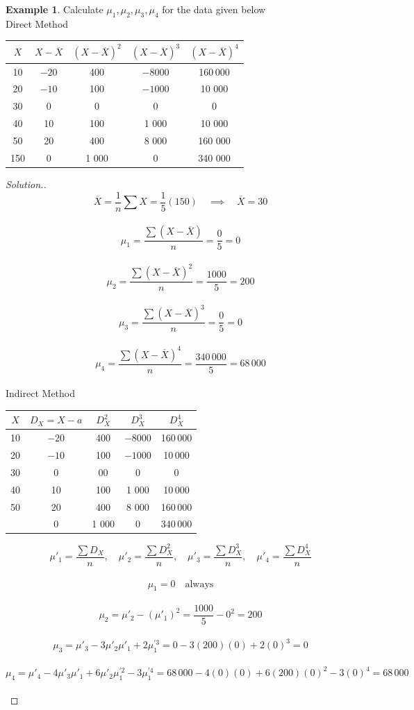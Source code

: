 \documentclass[11pt,a4paper]{article}
\theoremstyle{definition}
\newtheorem{example}[thm]{Example}
\newenvironment{solution}
  {\renewcommand{\qedsymbol}{}\begin{proof}[\textit{Solution}.]}
  {\end{proof}}
\begin{document}
\begin{example}
Calculate $\mu_1, \mu_2, \mu_3, \mu_4$ for the data given below\\
Direct Method\\

\begin{table}[H]
\centering
\begin{tabular}{|c|c|c|c|c|}
\hline $X$&$X-\overline{X}$&$(X-\overline{X})^2$&$(X-\overline{X})^3$&$(X-\overline{X})^4$\\
\hline 10&$-20$&400&$-8 000$&160\,000\\
20&$-10$&100&$-1 000$&10 000\\
30&0&0&0&0\\
40&10&100&1 000&10 000\\
50&20&400&8 000&160 000\\
\hline 150&0&1 000&0& 340 000\\
\hline
\end{tabular}
\end{table}
\end{example}

\begin{solution}
\[\overline{X}=\frac{1}{n}\sum X=\frac{1}{5}(150)\quad \implies\quad \overline{X}=30\]\\
\[\mu_1=\frac{\sum (X-\overline{X})}{n}=\frac{0}{5}=0\]\\
\[\mu_2=\frac{\sum (X-\overline{X})^2}{n}=\frac{1000}{5}=200\]\\
\[\mu_3=\frac{\sum (X-\overline{X})^3}{n}=\frac{0}{5}=0\]\\
\[\mu_4=\frac{\sum (X-\overline{X})^4}{n}=\frac{340\,000}{5}=68\,000\]\\


Indirect Method\\
\begin{table}[H]
\centering
\begin{tabular}{|c|c|c|c|c|}
\hline $X$&$D_X=X-a$&$D_X^2$&$D^3_X$&$D_X^4$\\
\hline 10&$-20$&400&$-8 000$& 160\,000\\
20&$-10$&100&$-1 000$&10\,000\\
30&0&00&0&0\\
40&10&100&1 000&10\,000\\
50&20&400&8 000&160\,000\\
\hline &0&1 000&0&340\,000\\
\hline
\end{tabular}
\end{table}

\[\mu'_1=\frac{\sum D_X}{n},\quad  \mu'_2=\frac{\sum D^2_X}{n},\quad \mu'_3=\frac{\sum D^3_X}{n},\quad \mu'_4=\frac{\sum D^4_X}{n}\]\\
\[\mu_1=0\quad \text{always}\]\\
\[\mu_2=\mu'_2-\left(\mu'_1\right)^2=\frac{1000}{5}-0^2=200\]\\
\[\mu_3=\mu'_3-3\mu'_2\mu'_1+2\mu^{\prime 3}_1=0-3(200)(0)+2(0)^3=0\]\\
\[\mu_4=\mu'_4-4\mu'_3\mu'_1+6\mu'_2\mu^{\prime 2}_1-3\mu^{\prime 4}_1=68\,000-4(0)(0)+6(200)(0)^2-3(0)^4=68\,000\]\\
\end{solution}
\end{document}
